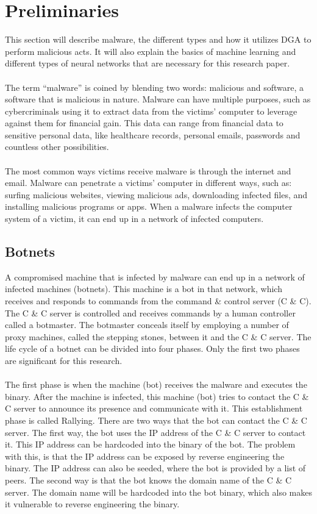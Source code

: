 \chapter{Preliminaries}\label{preliminaries}
This section will describe malware, the different types and how it utilizes DGA to perform malicious acts. It will also explain the basics of machine learning and different types of neural networks that are necessary for this research paper.\\\\ 
The term “malware” is coined by blending two words: malicious and software, a software that is malicious in nature. Malware can have multiple purposes, such as cybercriminals using it to extract data from the victims' computer to leverage against them for financial gain. This data can range from financial data to sensitive personal data, like healthcare records, personal emails, passwords and countless other possibilities.\\\\
The most common ways victims receive malware is through the internet and email.  Malware can penetrate a victims' computer in different ways, such as: surfing malicious websites, viewing malicious ads, downloading infected files, and installing malicious programs or apps. When a malware infects the computer system of a victim, it can end up in a network of infected computers.

\section{Botnets}
A compromised machine that is infected by malware can end up in a network of infected machines (botnets). This machine is a bot in that network, which receives and responds to commands from the command \& control server (C \& C). The C \& C server is controlled and receives commands by a human controller called a botmaster. The botmaster conceals itself by employing a number of proxy machines, called the stepping stones, between it and the C \& C server. The life cycle of a botnet can be divided into four phases. Only the first two phases are significant for this research.\\\\
The first phase is when the machine (bot) receives the malware and executes the binary. After the machine is infected, this machine (bot) tries to contact the C \& C server to announce its presence and communicate with it. This establishment phase is called Rallying. There are two ways that the bot can contact the C \& C server. The first way, the bot uses the IP address of the C \& C server to contact it. This IP address can be hardcoded into the binary of the bot. The problem with this, is that the IP address can be exposed by reverse engineering the binary. The IP address can also be seeded, where the bot is provided by a list of peers. The second way is that the bot knows the domain name of the C \& C server. The domain name will be hardcoded into the bot binary, which also makes it vulnerable to reverse engineering the binary.

